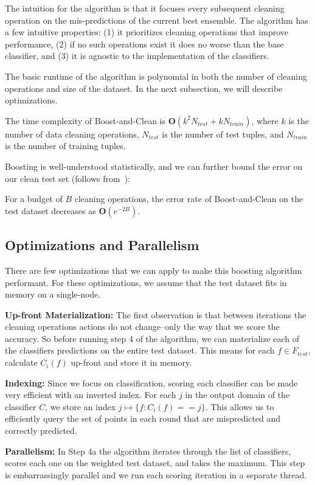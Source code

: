 The intuition for the algorithm is that it focuses every subsequent cleaning operation on the mis-predictions of the current best ensemble.
The algorithm has a few intuitive properties: (1) it prioritizes cleaning operations that improve performance, (2) if no such operations exist it does no worse than the base classifier, and (3) it is agnostic to the implementation of the classifiers.

The basic runtime of the algorithm is polynomial in both the number of cleaning operations and size of the dataset. In the next subsection, we will describe optimizations.

\begin{proposition}
The time complexity of Boost-and-Clean is $\mathbf{O}(k^2 N_{test} + k N_{train})$, where $k$ is the number of data cleaning operations, $N_{test}$ is the number of test tuples, and $N_{train}$ is the number of training tuples.
\end{proposition}

Boosting is well-understood statistically, and we can further bound the error on our clean test set (follows from~\cite{schapire2003boosting}):

\begin{proposition}
For a budget of $B$ cleaning operations, the error rate of Boost-and-Clean on the test dataset decreases as $\mathbf{O}(e^{-2B})$.
\end{proposition}


\subsection{Optimizations and Parallelism}
There are few optimizations that we can apply to make this 
boosting algorithm performant. For these optimizations, we assume that the test dataset fits in memory on a single-node.

\vspace{0.25em}\noindent\textbf{Up-front Materialization: } The first observation is that between iterations the cleaning operations actions do not change--only the way that we score the accuracy. So before running step 4 of the algorithm, we can materialize each of the classifiers predictions on the entire test dataset.
This means for each $f \in F_{test}$, calculate $C_i(f)$ up-front and store it in memory.

\vspace{0.25em}\noindent\textbf{Indexing: } Since we focus on classification, scoring each classifier can be made very efficient with an inverted index.
For each $j$ in the output domain of the classifier $C$, we store an index $j \mapsto \{f : C_i(f) == j\}$.
This allows us to efficiently query the set of points in each round that are mispredicted and correctly predicted.

\vspace{0.25em}\noindent\textbf{Parallelism: }
In Step 4a the algorithm iterates through the list of classifiers, scores each one on the weighted test dataset, and takes the maximum.
This step is embarrassingly parallel and we run each scoring iteration in a separate thread.





